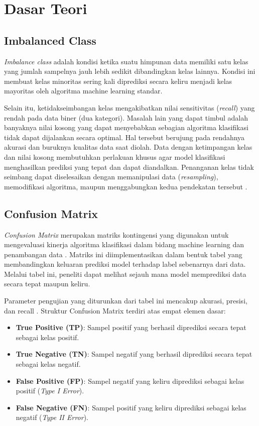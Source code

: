 \documentclass[a4paper,oneside,12pt]{report}
\begin{document}
\clearpage

\chapter[Dasar Teori]{Dasar Teori}

\section{Imbalanced Class}
\textit{Imbalance class} adalah kondisi ketika suatu himpunan data memiliki satu kelas yang jumlah sampelnya jauh lebih sedikit dibandingkan kelas lainnya. Kondisi ini membuat kelas minoritas sering kali diprediksi secara keliru menjadi kelas mayoritas oleh algoritma machine learning standar.

Selain itu, ketidakseimbangan kelas mengakibatkan nilai sensitivitas (\textit{recall}) yang rendah pada data biner (dua kategori). Masalah lain yang dapat timbul adalah banyaknya nilai kosong yang dapat menyebabkan sebagian algoritma klasifikasi tidak dapat dijalankan secara optimal. Hal tersebut berujung pada rendahnya akurasi dan buruknya kualitas data saat diolah. Data dengan ketimpangan kelas dan nilai kosong membutuhkan perlakuan khusus agar model klasifikasi menghasilkan prediksi yang tepat dan dapat diandalkan. Penanganan kelas tidak seimbang dapat diselesaikan dengan memanipulasi data (\textit{resampling}), memodifikasi algoritma, maupun menggabungkan kedua pendekatan tersebut \cite{ref_istiana}.

\section{Confusion Matrix}
\textit{Confusion Matrix} merupakan matriks kontingensi yang digunakan untuk mengevaluasi kinerja algoritma klasifikasi dalam bidang machine learning dan penambangan data \cite{ref_normawati}. Matriks ini diimplementasikan dalam bentuk tabel yang membandingkan keluaran prediksi model terhadap label sebenarnya dari data. Melalui tabel ini, peneliti dapat melihat sejauh mana model memprediksi data secara tepat maupun keliru.

Parameter pengujian yang diturunkan dari tabel ini mencakup akurasi, presisi, dan recall \cite{ref_septiana}. Struktur Confusion Matrix terdiri atas empat elemen dasar:
\begin{itemize}
    \item \textbf{True Positive (TP)}: Sampel positif yang berhasil diprediksi secara tepat sebagai kelas positif.
    \item \textbf{True Negative (TN)}: Sampel negatif yang berhasil diprediksi secara tepat sebagai kelas negatif.
    \item \textbf{False Positive (FP)}: Sampel negatif yang keliru diprediksi sebagai kelas positif (\textit{Type I Error}).
    \item \textbf{False Negative (FN)}: Sampel positif yang keliru diprediksi sebagai kelas negatif (\textit{Type II Error}).
\end{itemize}
\end{document}
